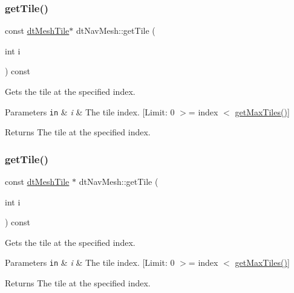 \subsubsection{\texorpdfstring{get\+Tile()}{getTile()}\hspace{0.1cm}{\footnotesize\ttfamily [1/2]}}
{\footnotesize\ttfamily const \hyperlink{structdtMeshTile}{dt\+Mesh\+Tile}$\ast$ dt\+Nav\+Mesh\+::get\+Tile (\begin{DoxyParamCaption}\item[{int}]{i }\end{DoxyParamCaption}) const}

Gets the tile at the specified index. 
\begin{DoxyParams}[1]{Parameters}
\mbox{\tt in}  & {\em i} & The tile index. \mbox{[}Limit\+: 0 $>$= index $<$ \hyperlink{classdtNavMesh_a17672fe19464d55eb66dc69f5f2f2b3f}{get\+Max\+Tiles()}\mbox{]} \\
\hline
\end{DoxyParams}
\begin{DoxyReturn}{Returns}
The tile at the specified index. 
\end{DoxyReturn}
\mbox{\label{classdtNavMesh_a52bb4f57b24a139600cfb6aeec1d9bcd}} 
\subsubsection{\texorpdfstring{get\+Tile()}{getTile()}\hspace{0.1cm}{\footnotesize\ttfamily [2/2]}}
{\footnotesize\ttfamily const \hyperlink{structdtMeshTile}{dt\+Mesh\+Tile} $\ast$ dt\+Nav\+Mesh\+::get\+Tile (\begin{DoxyParamCaption}\item[{int}]{i }\end{DoxyParamCaption}) const}

Gets the tile at the specified index. 
\begin{DoxyParams}[1]{Parameters}
\mbox{\tt in}  & {\em i} & The tile index. \mbox{[}Limit\+: 0 $>$= index $<$ \hyperlink{classdtNavMesh_a17672fe19464d55eb66dc69f5f2f2b3f}{get\+Max\+Tiles()}\mbox{]} \\
\hline
\end{DoxyParams}
\begin{DoxyReturn}{Returns}
The tile at the specified index. 
\end{DoxyReturn}
\mbox{\label{classdtNavMesh_a36a84aa7296d5cc257eb3ddc38181253}} 
